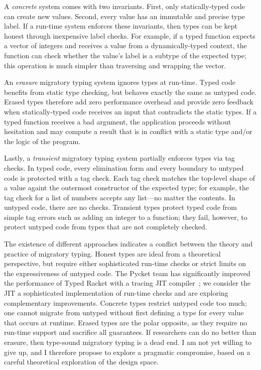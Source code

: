 A \emph{concrete}\/ system comes with two invariants.
First, only statically-typed code can create new values.
Second, every value has an immutable and precise type label.
If a run-time system enforces these invariants, then types can be kept honest
 through inexpensive label checks.
For example, if a typed function expects a vector of integers and receives
 a value from a dynamically-typed context, the function can check whether the
 value's label is a subtype of the expected type; this operation is much
 simpler than traversing and wrapping the vector.

An \emph{erasure}\/ migratory typing system ignores types at run-time.
Typed code benefits from static type checking, but behaves exactly the same
 as untyped code.
Erased types therefore add zero performance overhead and provide zero feedback
 when statically-typed code receives an input that contradicts the static
 types.
If a typed function receives a bad argument, the application proceeds without
 hesitation and may compute a result that is in conflict with a
 static type and/or the logic of the program.

Lastly, a \emph{transient}\/ migratory typing system partially enforces types
 via tag checks.
In typed code, every elimination form and every boundary to untyped code
 is protected with a tag check.
Each tag check matches the top-level shape of a value againt the outermost
 constructor of the expected type; for example, the tag check for a
 list of numbers accepts any list---no matter the contents.
In untyped code, there are no checks.
Transient types protect typed code from simple
 tag errors such as adding an integer to a function; they fail, however,
 to protect untyped code from types that are not completely checked.

The existence of different approaches indicates a conflict between the theory
 and practice of migratory typing.
Honest types are ideal from a theoretical perspective, but require either
 sophisticated run-time checks or strict limits on the expressiveness of
 untyped code.
The Pycket team has significantly improved the performance
 of Typed Racket with a tracing JIT compiler~\cite{bbst-oopsla-2017};
 we consider the JIT a sophisticated implementation of run-time checks
 and are exploring complementary improvements.
Concrete types restrict untyped code too much; one cannot migrate from untyped
 without first defining a type for every value that occurs at runtime.
Erased types are the polar opposite, as they require no run-time support
 and sacrifice all guarantees.
If researchers can do no better than erasure, then
 type-sound migratory typing is a dead end.
I am not yet willing to give up, and I therefore propose to explore a pragmatic
 compromise, based on a careful theoretical exploration of the design space.

